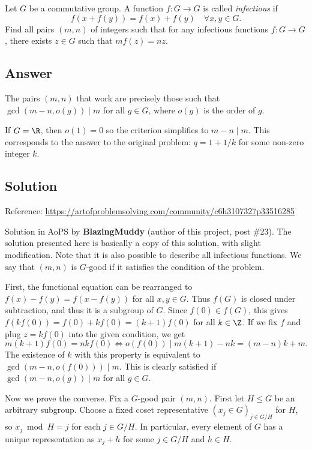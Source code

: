 Let $G$ be a commutative group.
A function $f : G \to G$ is called \emph{infectious} if
\[ f(x + f(y)) = f(x) + f(y) \quad \forall x, y \in G. \]
Find all pairs $(m, n)$ of integers such that for any infectious functions $f : G \to G$, there exists $z \in G$ such that $m f(z) = nz$.



\subsection*{Answer}

The pairs $(m, n)$ that work are precisely those such that $\gcd(m - n, o(g)) \mid m$ for all $g \in G$, where $o(g)$ is the order of $g$.

If $G = \R$, then $o(1) = 0$ so the criterion simplifies to $m - n \mid m$.
This corresponds to the answer to the original problem: $q = 1 + 1/k$ for some non-zero integer $k$.



\subsection*{Solution}

Reference: \url{https://artofproblemsolving.com/community/c6h3107327p33516285}

Solution in AoPS by \textbf{BlazingMuddy} (author of this project, post \#23).
The solution presented here is basically a copy of this solution, with slight modification.
Note that it is also possible to describe all infectious functions.
We say that $(m, n)$ is $G$-good if it satisfies the condition of the problem.

First, the functional equation can be rearranged to $f(x) - f(y) = f(x - f(y))$ for all $x, y \in G$.
Thus $f(G)$ is closed under subtraction, and thus it is a subgroup of $G$.
Since $f(0) \in f(G)$, this gives $f(k f(0)) = f(0) + k f(0) = (k + 1) f(0)$ for all $k \in \Z$.
If we fix $f$ and plug $z = k f(0)$ into the given condition, we get
\[ m (k + 1) f(0) = n k f(0) \iff o(f(0)) \mid m(k + 1) - nk = (m - n) k + m. \]
The existence of $k$ with this property is equivalent to $\gcd(m - n, o(f(0))) \mid m$.
This is clearly satisfied if $\gcd(m - n, o(g)) \mid m$ for all $g \in G$.

Now we prove the converse.
Fix a $G$-good pair $(m, n)$.
First let $H \leq G$ be an arbitrary subgroup.
Choose a fixed coset representative $(x_j \in G)_{j \in G/H}$ for $H$, so $x_j \bmod{H} = j$ for each $j \in G/H$.
In particular, every element of $G$ has a unique representation as $x_j + h$ for some $j \in G/H$ and $h \in H$.

